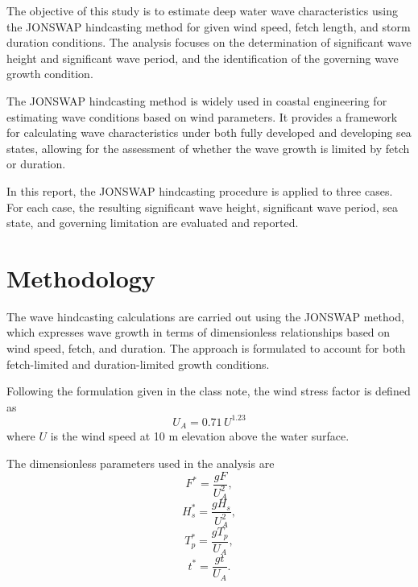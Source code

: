 \documentclass[a4paper, 11pt]{article}
\begin{document}
\hspace*{0.5cm}The objective of this study is to estimate deep water wave characteristics using the JONSWAP hindcasting method for given wind speed, fetch length, and storm duration conditions. The analysis focuses on the determination of significant wave height and significant wave period, and the identification of the governing wave growth condition.

The JONSWAP hindcasting method is widely used in coastal engineering for estimating wave conditions based on wind parameters. It provides a framework for calculating wave characteristics under both fully developed and developing sea states, allowing for the assessment of whether the wave growth is limited by fetch or duration.

In this report, the JONSWAP hindcasting procedure is applied to three cases. For each case, the resulting significant wave height, significant wave period, sea state, and governing limitation are evaluated and reported.

\section{Methodology}

\hspace*{0.5cm}The wave hindcasting calculations are carried out using the JONSWAP method, which expresses wave growth in terms of dimensionless relationships based on wind speed, fetch, and duration. The approach is formulated to account for both fetch-limited and duration-limited growth conditions.

Following the formulation given in the class note, the wind stress factor is defined as
\begin{equation}
U_A = 0.71\,U^{1.23}
\end{equation}
where \(U\) is the wind speed at 10 m elevation above the water surface.

The dimensionless parameters used in the analysis are
\begin{equation}
F^*=\frac{gF}{U_A^2},
\end{equation}
\begin{equation}
H_s^*=\frac{gH_s}{U_A^2},
\end{equation}
\begin{equation}
T_p^*=\frac{gT_p}{U_A},
\end{equation}
\begin{equation}
t^*=\frac{gt}{U_A}.
\end{equation}
\end{document}
